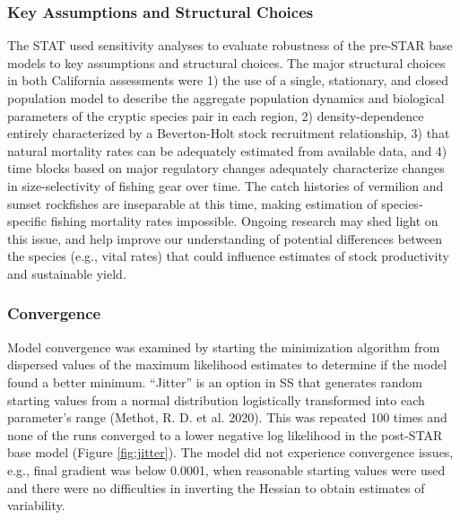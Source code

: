 \documentclass[11pt,
  english,
]{article}
\begin{document}

\hypertarget{key-assumptions-and-structural-choices}{%
\subsubsection{Key Assumptions and Structural Choices}\label{key-assumptions-and-structural-choices}}

\leavevmode\tagmcend\tagstructend

The STAT used sensitivity analyses to evaluate robustness of the pre-STAR base models to key assumptions and structural choices. The major structural choices in both California assessments were 1) the use of a single, stationary, and closed population model to describe the aggregate population dynamics and biological parameters of the cryptic species pair in each region, 2) density-dependence entirely characterized by a Beverton-Holt stock recruitment relationship, 3) that natural mortality rates can be adequately estimated from available data, and 4) time blocks based on major regulatory changes adequately characterize changes in size-selectivity of fishing gear over time. The catch histories of vermilion and sunset rockfishes are inseparable at this time, making estimation of species-specific fishing mortality rates impossible. Ongoing research may shed light on this issue, and help improve our understanding of potential differences between the species (e.g., vital rates) that could influence estimates of stock productivity and sustainable yield.


\hypertarget{convergence}{%
\subsubsection{Convergence}\label{convergence}}

\leavevmode\tagmcend\tagstructend

Model convergence was examined by starting the minimization algorithm from dispersed values of the maximum likelihood estimates to determine if the model found a better minimum. ``Jitter'' is an option in SS that generates random starting values from a normal distribution logistically transformed into each parameter's range {(Methot, R. D. et al. 2020)\leavevmode\tagmcend\tagstructend}. This was repeated 100 times and none of the runs converged to a lower negative log likelihood in the post-STAR base model (Figure \ref{fig:jitter}). The model did not experience convergence issues, e.g., final gradient was below 0.0001, when reasonable starting values were used and there were no difficulties in inverting the Hessian to obtain estimates of variability.
\end{document}
